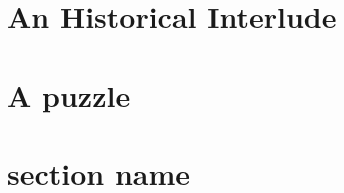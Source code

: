 \documentclass[12pt]{article}
\begin{document}
\section{An Historical Interlude} %
\label{sec:an_historical_interlude}




\section{A puzzle} %
\label{sec:a_puzzle}




\section{section name} %
\label{sec:section_name}




\end{document}
